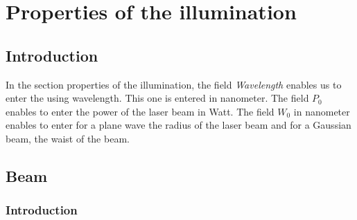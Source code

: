 \chapter{Properties of the illumination }\label{chap3}

\minitoc

\section{Introduction}

In the section properties of the illumination, the field {\it
  Wavelength} enables us to enter the using wavelength. This one is
entered in nanometer. The field $P_0$ enables to enter the power of
the laser beam in Watt. The field $W_0$ in nanometer enables to enter
for a plane wave the radius of the laser beam and for a Gaussian beam,
the waist of the beam.

\section{Beam}

\subsection{Introduction}

